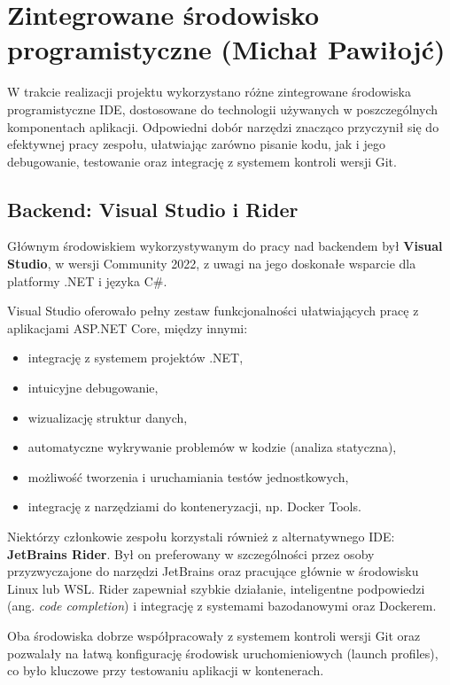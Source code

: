 \section{Zintegrowane środowisko programistyczne (Michał Pawiłojć)}

W trakcie realizacji projektu wykorzystano różne zintegrowane środowiska programistyczne IDE, dostosowane do technologii używanych w poszczególnych komponentach aplikacji. Odpowiedni dobór narzędzi znacząco przyczynił się do efektywnej pracy zespołu, ułatwiając zarówno pisanie kodu, jak i jego debugowanie, testowanie oraz integrację z systemem kontroli wersji Git.

\subsection{Backend: Visual Studio i Rider}

Głównym środowiskiem wykorzystywanym do pracy nad backendem był \textbf{Visual Studio}, w wersji Community 2022, z uwagi na jego doskonałe wsparcie dla platformy .NET i języka C\#.

Visual Studio oferowało pełny zestaw funkcjonalności ułatwiających pracę z aplikacjami ASP.NET Core, między innymi:
\begin{itemize}
    \item integrację z systemem projektów .NET,
    \item intuicyjne debugowanie,
    \item wizualizację struktur danych,
    \item automatyczne wykrywanie problemów w kodzie (analiza statyczna),
    \item możliwość tworzenia i uruchamiania testów jednostkowych,
    \item integrację z narzędziami do konteneryzacji, np. Docker Tools.
\end{itemize}

Niektórzy członkowie zespołu korzystali również z alternatywnego IDE: \textbf{JetBrains Rider}. Był on preferowany w szczególności przez osoby przyzwyczajone do narzędzi JetBrains oraz pracujące głównie w środowisku Linux lub WSL. Rider zapewniał szybkie działanie, inteligentne podpowiedzi (ang. \textit{code completion}) i integrację z systemami bazodanowymi oraz Dockerem.

Oba środowiska dobrze współpracowały z systemem kontroli wersji Git oraz pozwalały na łatwą konfigurację środowisk uruchomieniowych (launch profiles), co było kluczowe przy testowaniu aplikacji w kontenerach.

